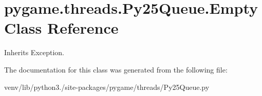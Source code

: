 \hypertarget{classpygame_1_1threads_1_1_py25_queue_1_1_empty}{}\section{pygame.\+threads.\+Py25\+Queue.\+Empty Class Reference}
\label{classpygame_1_1threads_1_1_py25_queue_1_1_empty}


Inherits Exception.



The documentation for this class was generated from the following file\+:\begin{DoxyCompactItemize}
\item 
venv/lib/python3./site-\/packages/pygame/threads/Py25\+Queue.\+py\end{DoxyCompactItemize}
